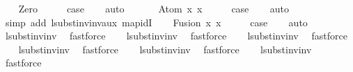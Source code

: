 \begin{isabellebody}
\ \ \isamarkupfalse%
\ Zero\isanewline
\ \ \isamarkupfalse%
\ \isamarkupfalse%
\ {\isacharquery}{\kern0pt}case\isanewline
\ \ \isamarkupfalse%
\ auto\isanewline
\ \ \isamarkupfalse%
\isanewline
{}\isamarkupfalse%
\isanewline
\ \ \isamarkupfalse%
\ {\isacharparenleft}{\kern0pt}Atom\ x{}\ x{}{\isacharparenright}{\kern0pt}\isanewline
\ \ \isamarkupfalse%
\ \isamarkupfalse%
\ {\isacharquery}{\kern0pt}case\isanewline
\ \ \isamarkupfalse%
\ auto\isanewline
\ \ \isamarkupfalse%
\ {\isacharparenleft}{\kern0pt}simp\ add{\isacharcolon}{\kern0pt}\ lsubst{\isacharunderscore}{\kern0pt}inv{\isacharunderscore}{\kern0pt}inv{\isacharunderscore}{\kern0pt}aux{}\ map{\isacharunderscore}{\kern0pt}idI{\isacharparenright}{\kern0pt}\isanewline
{}\isamarkupfalse%
\isanewline
\ \ \isamarkupfalse%
\ {\isacharparenleft}{\kern0pt}Fusion\ x{}\ x{}{\isacharparenright}{\kern0pt}\isanewline
\ \ \isamarkupfalse%
\ \isamarkupfalse%
\ {\isacharquery}{\kern0pt}case\isanewline
\ \ \isamarkupfalse%
\ auto\isanewline
\ \ \isamarkupfalse%
\ lsubst{\isacharunderscore}{\kern0pt}inv{\isacharunderscore}{\kern0pt}inv{}\ \isamarkupfalse%
\ fastforce\isanewline
\ \ \isamarkupfalse%
\ lsubst{\isacharunderscore}{\kern0pt}inv{\isacharunderscore}{\kern0pt}inv{}\ \isamarkupfalse%
\ fastforce\isanewline
\ \ \isamarkupfalse%
\ lsubst{\isacharunderscore}{\kern0pt}inv{\isacharunderscore}{\kern0pt}inv{}\ \isamarkupfalse%
\ fastforce\isanewline
\ \ \isamarkupfalse%
\ lsubst{\isacharunderscore}{\kern0pt}inv{\isacharunderscore}{\kern0pt}inv{}\ \isamarkupfalse%
\ fastforce\isanewline
\ \ \isamarkupfalse%
\ lsubst{\isacharunderscore}{\kern0pt}inv{\isacharunderscore}{\kern0pt}inv{}\ \isamarkupfalse%
\ fastforce\isanewline
\ \ \isamarkupfalse%
\ lsubst{\isacharunderscore}{\kern0pt}inv{\isacharunderscore}{\kern0pt}inv{}\ \isamarkupfalse%
\ fastforce\isanewline
\ \ \isamarkupfalse%
\isanewline
{}\isamarkupfalse%

\end{isabellebody}
